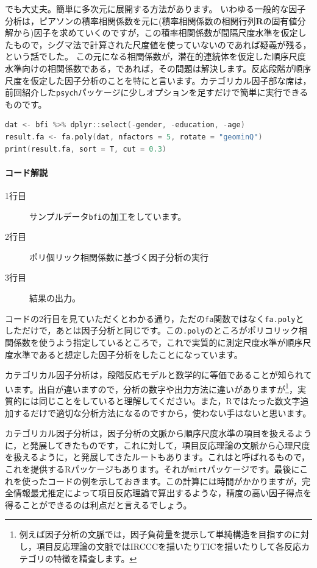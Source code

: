 \documentclass{ltjsbook}
\begin{document}
でも大丈夫。簡単に多次元に展開する方法があります。
いわゆる一般的な因子分析は，ピアソンの積率相関係数を元に(積率相関係数の相関行列$\bm{R}$の固有値分解から)因子を求めていくのですが，この積率相関係数が間隔尺度水準を仮定したもので，シグマ法で計算された尺度値を使っていないのであれば疑義が残る，という話でした。
この元になる相関係数が，潜在的連続体を仮定した順序尺度水準向けの相関係数である，であれば，その問題は解決します。反応段階が順序尺度を仮定した因子分析のことを特にと言います。カテゴリカル因子部な席は，前回紹介した\texttt{psych}パッケージに少しオプションを足すだけで簡単に実行できるものです。

\begin{lstlisting}[language=c++,label={code::11_06},caption={GRMの実行}]
dat <- bfi %>% dplyr::select(-gender, -education, -age)
result.fa <- fa.poly(dat, nfactors = 5, rotate = "geominQ")
print(result.fa, sort = T, cut = 0.3)
\end{lstlisting}

\paragraph{コード解説}
\begin{description}
        \item[1行目] サンプルデータ\texttt{bfi}の加工をしています。
        \item[2行目] ポリ個リック相関係数に基づく因子分析の実行
        \item[3行目] 結果の出力。
\end{description}

コードの2行目を見ていただくとわかる通り，ただの\texttt{fa}関数ではなく\texttt{fa.poly}としただけで，あとは因子分析と同じです。この\texttt{.poly}のところがポリコリック相関係数を使うよう指定しているところで，これで実質的に測定尺度水準が順序尺度水準であると想定した因子分析をしたことになっています。

カテゴリカル因子分析は，段階反応モデルと数学的に等価であることが知られています。出自が違いますので，分析の数字や出力方法に違いがありますが\footnote{例えば因子分析の文脈では，因子負荷量を提示して単純構造を目指すのに対し，項目反応理論の文脈ではIRCCCを描いたりTICを描いたりして各反応カテゴリの特徴を精査します。}，実質的には同じことをしていると理解してください。また，Rではたった数文字追加するだけで適切な分析方法になるのですから，使わない手はないと思います。

カテゴリカル因子分析は，因子分析の文脈から順序尺度水準の項目を扱えるように，と発展してきたものです，これに対して，項目反応理論の文脈から心理尺度を扱えるように，と発展してきたルートもあります。これはと呼ばれるもので，これを提供するRパッケージもあります。それが\texttt{mirt}パッケージ\citep{mirt}です。最後にこれを使ったコードの例を示しておきます。この計算には時間がかかりますが，完全情報最尤推定によって項目反応理論で算出するような，精度の高い因子得点を得ることができるのは利点だと言えるでしょう。
\end{document}
